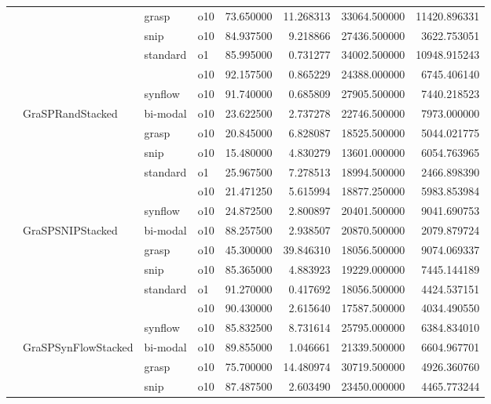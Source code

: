 \begin{longtable}{llllrrrr}
      &     & grasp & o10 &  73.650000 &  11.268313 &     33064.500000 &  11420.896331 \\
      &     & snip & o10 &  84.937500 &   9.218866 &     27436.500000 &   3622.753051 \\
      &     & standard & o1 &  85.995000 &   0.731277 &     34002.500000 &  10948.915243 \\
      &     &         & o10 &  92.157500 &   0.865229 &     24388.000000 &   6745.406140 \\
      &     & synflow & o10 &  91.740000 &   0.685809 &     27905.500000 &   7440.218523 \\
      & GraSPRandStacked & bi-modal & o10 &  23.622500 &   2.737278 &     22746.500000 &   7973.000000 \\
      &     & grasp & o10 &  20.845000 &   6.828087 &     18525.500000 &   5044.021775 \\
      &     & snip & o10 &  15.480000 &   4.830279 &     13601.000000 &   6054.763965 \\
      &     & standard & o1 &  25.967500 &   7.278513 &     18994.500000 &   2466.898390 \\
      &     &         & o10 &  21.471250 &   5.615994 &     18877.250000 &   5983.853984 \\
      &     & synflow & o10 &  24.872500 &   2.800897 &     20401.500000 &   9041.690753 \\
      & GraSPSNIPStacked & bi-modal & o10 &  88.257500 &   2.938507 &     20870.500000 &   2079.879724 \\
      &     & grasp & o10 &  45.300000 &  39.846310 &     18056.500000 &   9074.069337 \\
      &     & snip & o10 &  85.365000 &   4.883923 &     19229.000000 &   7445.144189 \\
      &     & standard & o1 &  91.270000 &   0.417692 &     18056.500000 &   4424.537151 \\
      &     &         & o10 &  90.430000 &   2.615640 &     17587.500000 &   4034.490550 \\
      &     & synflow & o10 &  85.832500 &   8.731614 &     25795.000000 &   6384.834010 \\
      & GraSPSynFlowStacked & bi-modal & o10 &  89.855000 &   1.046661 &     21339.500000 &   6604.967701 \\
      &     & grasp & o10 &  75.700000 &  14.480974 &     30719.500000 &   4926.360760 \\
      &     & snip & o10 &  87.487500 &   2.603490 &     23450.000000 &   4465.773244 \\

\end{longtable}
